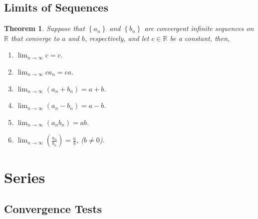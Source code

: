 \documentclass{article}
\theoremstyle{plain}
\newtheorem{theorem}{Theorem}[section]
\numberwithin{theorem}{section}
\theoremstyle{definition}
\numberwithin{definition}{section}
\theoremstyle{remark}
\numberwithin{note}{section}
\newcommand*{\R}{\mathbb{R}}
\begin{document}
\subsection{Limits of Sequences}
\begin{theorem}
	Suppose that $\left\{a_n\right\}$ and $\left\{b_n\right\}$ are convergent infinite sequences on $\R$ that converge to $a$ and $b$, respectively, and let $c\in\R$ be a constant, then,
	\begin{enumerate}[label=\alph*)]
		\item $\lim_{n\rightarrow\infty}c=c$.
		\item $\lim_{n\rightarrow\infty}ca_n=ca$.
		\item $\lim_{n\rightarrow\infty}\left( a_n + b_n \right)=a+b$.
		\item $\lim_{n\rightarrow\infty}\left( a_n - b_n \right)=a-b$.
		\item $\lim_{n\rightarrow\infty}\left( a_nb_n \right)=ab$.
		\item $\lim_{n\rightarrow\infty}\left( \frac{a_n}{b_n} \right)=\frac{a}{b}$, ($b\neq 0$).
	\end{enumerate}
\end{theorem}

\section{Series}

%
\subsection{Convergence Tests}

%
\end{document}
